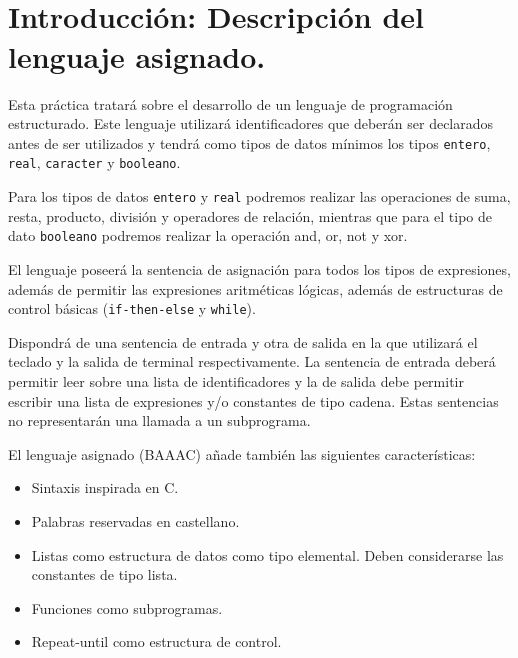 \documentclass[12pt, spanish]{article}
\makeatletter
\let\thedate\@date
\makeatother
\begin{document}
\begin{titlepage}
\begin{minipage}{0.4\textwidth}
\begin{flushright}
        \end{flushright}
    \end{minipage}\\[0.5cm]

    {\large \thedate}\\[0.5cm]
    {\doclicenseThis}

    \vfill

\end{titlepage}


\tableofcontents
\pagebreak




\section{Introducción: Descripción del lenguaje asignado.}

Esta práctica tratará sobre el desarrollo de un lenguaje de programación estructurado. Este lenguaje utilizará identificadores que deberán ser declarados antes de ser utilizados y tendrá como tipos de datos mínimos los tipos \texttt{entero}, \texttt{real}, \texttt{caracter} y \texttt{booleano}.

Para los tipos de datos \texttt{entero} y \texttt{real} podremos realizar las operaciones de suma, resta, producto, división y operadores de relación, mientras que para el tipo de dato \texttt{booleano} podremos realizar la operación and, or, not y xor.

El lenguaje poseerá la sentencia de asignación para todos los tipos de expresiones, además de permitir las expresiones aritméticas lógicas, además de estructuras de control básicas (\texttt{if-then-else} y \texttt{while}).

Dispondrá de una sentencia de entrada y otra de salida en la que utilizará el teclado y la salida de terminal respectivamente. La sentencia de entrada deberá permitir leer sobre una lista de identificadores y la de salida debe permitir escribir una lista de expresiones y/o constantes de tipo cadena. Estas sentencias no representarán una llamada a un subprograma.

El lenguaje asignado (BAAAC) añade también las siguientes características:

\begin{itemize}
	\item Sintaxis inspirada en C.
	\item Palabras reservadas en castellano.
	\item Listas como estructura de datos como tipo elemental. Deben considerarse las constantes de tipo lista.
	\item Funciones como subprogramas.
	\item Repeat-until como estructura de control.
\end{itemize}
\end{document}
